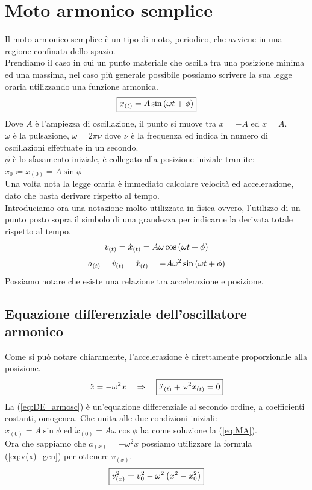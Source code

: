 \section{Moto armonico semplice}
Il moto armonico semplice è un tipo di moto, periodico, che avviene in una
regione confinata dello spazio.\\
Prendiamo il caso in cui un punto materiale che oscilla tra una posizione minima
ed una massima, nel caso più generale possibile possiamo scrivere la sua
legge oraria utilizzando una funzione armonica.
\begin{equation}
    \boxed{x_{(t)} = A\sin\left( \omega t +\phi\right)}
\label{eq:MA}
\end{equation}
Dove $A$ è l'ampiezza di oscillazione, il punto si muove tra $ x = -A$ ed
$x = A$.\\
$\omega$ è la pulsazione, $\omega = 2\pi\nu$ dove $\nu$ è la frequenza ed
indica in numero di oscillazioni effettuate in un secondo.\\
$\phi$ è lo sfasamento iniziale, è collegato alla posizione iniziale tramite:
$ x_0 \coloneqq x_{(0)} = A\sin\phi$\\
Una volta nota la legge oraria è immediato calcolare velocità ed accelerazione,
dato che basta derivare rispetto al tempo.\\
Introduciamo ora una notazione molto utilizzata in fisica ovvero, l'utilizzo
di un punto posto sopra il simbolo di una grandezza per indicarne la
derivata totale rispetto al tempo.
\begin{equation}
    v_{(t)} = \dot x_{(t)} = A\omega\cos\left(\omega t +\phi\right)
\label{eq:MA_velocity}
\end{equation}
\begin{equation}
    a_{(t)} = \dot v_{(t)} = \ddot x_{(t)} = -A\omega^2\sin\left(\omega t +\phi\right)
\label{eq:MA_acceleration}
\end{equation}
Possiamo notare che esiste una relazione tra accelerazione e posizione.

\subsection{Equazione differenziale dell'oscillatore armonico}

Come si può notare chiaramente, l'accelerazione è direttamente proporzionale
alla posizione.
\begin{equation}
    \ddot x = -\omega^2x\quad\Rightarrow\quad \boxed{\ddot x_{(t)} + \omega^2x_{(t)} = 0}
\label{eq:DE_armosc}
\end{equation}
La (\ref{eq:DE_armosc}) è un'equazione differenziale al secondo ordine,
a coefficienti costanti, omogenea. Che unita alle due condizioni iniziali:\\
$x_{(0)} = A\sin\phi$ ed $\dot x_{(0)} = A\omega\cos\phi $ ha come soluzione
la (\ref{eq:MA}).\\
Ora che sappiamo che $a_{(x)} = -\omega^2x$ possiamo utilizzare la formula
(\ref{eq:v(x)_gen}) per ottenere $v_{(x)}$.
\begin{equation}
    \boxed{v^2_{(x)} = v_0^2 - \omega^2\left( x^2 - x_0^2\right)}
\label{eq:v(x)_MA}
\end{equation}

